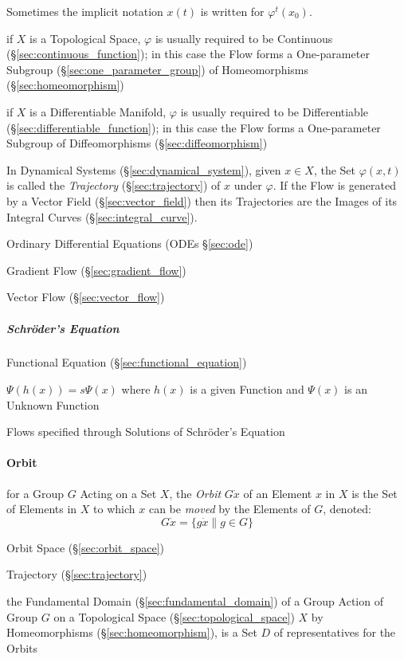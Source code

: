 Sometimes the implicit notation $x(t)$ is written for $\varphi^t(x_0)$.

if $X$ is a Topological Space, $\varphi$ is usually required to be Continuous
(\S\ref{sec:continuous_function}); in this case the Flow forms a One-parameter
Subgroup (\S\ref{sec:one_parameter_group}) of Homeomorphisms
(\S\ref{sec:homeomorphism})

if $X$ is a Differentiable Manifold, $\varphi$ is usually required to be
Differentiable (\S\ref{sec:differentiable_function}); in this case the Flow
forms a One-parameter Subgroup of Diffeomorphisms (\S\ref{sec:diffeomorphism})

In Dynamical Systems (\S\ref{sec:dynamical_system}), given $x \in X$, the Set
$\varphi(x,t)$ is called the \emph{Trajectory} (\S\ref{sec:trajectory}) of $x$
under $\varphi$. If the Flow is generated by a Vector Field
(\S\ref{sec:vector_field}) then its Trajectories are the Images of its Integral
Curves (\S\ref{sec:integral_curve}).

\fist Ordinary Differential Equations (ODEs \S\ref{sec:ode})

\fist Gradient Flow (\S\ref{sec:gradient_flow})

\fist Vector Flow (\S\ref{sec:vector_flow})



\subparagraph{Schr\"oder's Equation}\label{sec:schroders_equation}\hfill

Functional Equation (\S\ref{sec:functional_equation})

$\Psi(h(x)) = s\Psi(x)$ where $h(x)$ is a given Function and $\Psi(x)$ is
an Unknown Function

Flows specified through Solutions of Schr\"oder's Equation




\paragraph{Orbit}\label{sec:orbit}\hfill

for a Group $G$ Acting on a Set $X$, the \emph{Orbit} $G \dot x$ of an Element
$x$ in $X$ is the Set of Elements in $X$ to which $x$ can be \emph{moved} by
the Elements of $G$, denoted:
\[
  G \dot x = \{ g \dot x \| g \in G \}
\]

\fist Orbit Space (\S\ref{sec:orbit_space})

\fist Trajectory (\S\ref{sec:trajectory})

the Fundamental Domain (\S\ref{sec:fundamental_domain}) of a Group Action of
Group $G$ on a Topological Space (\S\ref{sec:topological_space}) $X$ by
Homeomorphisms (\S\ref{sec:homeomorphism}), is a Set $D$ of representatives for
the Orbits



